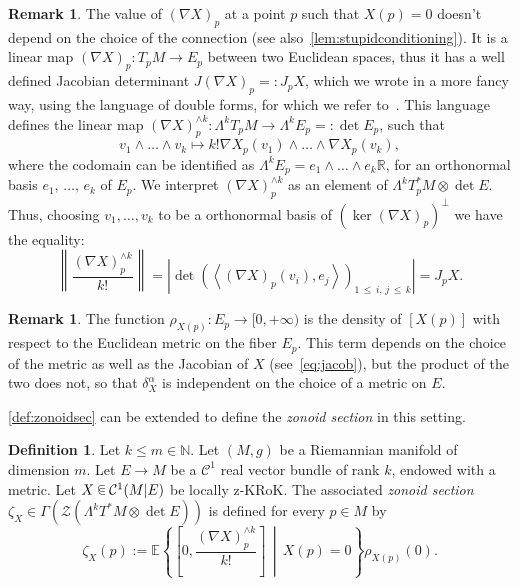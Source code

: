 \documentclass[10pt]{amsart}
\theoremstyle{definition}\newtheorem{defi}[theo]{Definition}\newtheorem{rema}[theo]{Remark}\newtheorem{exam}[theo]{Example}\newtheorem{exem}[theo]{Example}\newtheorem{nota}[theo]{Notation}
\newcommand{\R}{\mathbb{R}}
\newcommand{\N}{\mathbb{N}}
\newcommand{\EE}{\mathbb{E}}
\newcommand{\ZZ}{\mathscr{Z}}
\newcommand{\mC}{\mathcal{C}}
\renewcommand{\a}{\alpha}
\newcommand*\randin{
\mathchoice {\raisebox{-.35ex}{$\displaystyle{^\subset}$}\mkern-11.5mu\raisebox{+.45ex}{$\displaystyle{_\subset}$}} {\mkern+1mu\raisebox{-.27ex}{$\textstyle{^\subset}$}\mkern-11.7mu\raisebox{+.45ex}{$\textstyle{_\subset}$}} {\raisebox{.35ex}{$\scriptstyle\subset$}\mkern-14mu\raisebox{-.15ex}{$\scriptstyle\subset$}} {\raisebox{.3ex}{$\scriptscriptstyle\subset$}\mkern-13.5mu\raisebox{-.10ex}{$\scriptscriptstyle\subset$}}}
\begin{document}
\begin{rema}
The value of $(\nabla X)_p$ at a point $p$ such that $X(p)=0$ doesn't depend on the choice of the connection (see also~\cref{lem:stupidconditioning}). It is a linear map $(\nabla X)_p\colon T_pM\to E_p$ between two Euclidean spaces, thus it has a well defined Jacobian determinant $J(\nabla X)_p=:J_pX$, which we wrote in a more fancy way, using the language of double forms, for which we refer to~\cite{AdlerTaylor}. This language defines the linear map $(\nabla X)^{\wedge k}_p\colon \Lambda^kT_pM\to \Lambda^kE_p=:\det E_p$, such that
\begin{equation}\label{eq:wedgpow}
v_1\wedge\dots \wedge v_k\mapsto k! \nabla X_p(v_1)\wedge \dots \wedge \nabla X_p(v_k),
\end{equation}
where the codomain can be identified as $\Lambda^kE_p=e_1\wedge\dots\wedge e_k \R$, for an orthonormal basis $e_1,\,\dots,\,e_k$ of $E_p$. We interpret $(\nabla X)^{\wedge k}_p$ as an element of $\Lambda^kT^*_pM\otimes \det E$. Thus, choosing $v_1,\dots,v_k$ to be a orthonormal basis of $\left(\ker(\nabla X)_p\right)^\perp$ we have the equality:
\begin{equation}\label{eq:jacob}
\left\|\frac{(\nabla X)^{\wedge k}_p}{k!}
\right\|=
\left|\det\left(\left\langle(\nabla X)_p(v_i),e_j\right\rangle\right)_{1\,\le\,i,\,j\,\le\,k}\right| = J_pX.
\end{equation}
\end{rema}


\begin{rema}
The function $\rho_{X(p)}\colon E_p\to [0,+\infty)$ is the density of $[X(p)]$ with respect to the Euclidean metric on the fiber $E_p$. This term depends on the choice of the metric as well as the Jacobian of $X$ (see~\eqref{eq:jacob}), but the product of the two does not, so that $\delta^\a_X$ is independent on the choice of a metric on $E$.
\end{rema}
\cref{def:zonoidsec} can be extended to define the \emph{zonoid section} in this setting.

\begin{defi}\label{def:zonoidsecvb}
Let $k\le m\in \N$. Let $(M,g)$ be a Riemannian manifold of dimension $m$. Let $E\to M$ be a $\mC^1$ real vector bundle of rank $k$, endowed with a metric. Let $X\,\randin\, \mC^1(M|E)$ be locally z-KRoK. The associated \emph{zonoid section} $\zeta_X\in \Gamma(\ZZ(\Lambda^k T^*M\otimes \det E))$ is defined for every $p\in M$ by
\begin{equation*}
\zeta_X(p):=\EE\left\{\left[0,\frac{(\nabla X)^{\wedge k}_p}{k!}\right]\,\middle|\,X(p)=0\right\}\rho_{X(p)}(0).
\end{equation*}
\end{defi}
\end{document}

